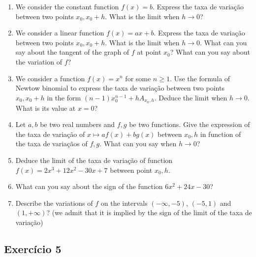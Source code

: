\begin{enumerate}

\item We consider the constant function $f(x) = b$. Express the
  taxa de variação between two points $x_0,x_0+h$.
  What is the limit when $h \rightarrow 0$?

\item We consider a linear function $f(x) = ax + b$. Express the
  taxa de variação between two points $x_0,x_0+h$. What is the limit when
  $h \rightarrow 0$. What can you say about the tangent of the graph of $f$
  at point $x_0$? What can you say about the variation of $f$?

\item We consider a function $f(x) = x^n$ for some $n \geq 1$.
  Use the formula of Newtow binomial to express the taxa de variação between
  two points $x_0,x_0+h$ in the form $(n-1) x_0^{n-1} + h A_{x_0,h}$.
  Deduce the limit when $h \rightarrow 0$. What is its value at $x = 0$?

\item Let $a,b$ be two real numbers and $f,g$ be two functions.
  Give the expression of the taxa de variação of $x \mapsto {af(x)+bg(x)}$
  between $x_0,h$ in function of the taxa de variaçãos of $f,g$.
  What can you say when $h \rightarrow 0$?

\item Deduce the limit of the taxa de variação of
  function $f(x) = 2x^3 + 12x^2 - 30x + 7$ between point $x_0,h$.

\item What can you say about the sign of the function
  $6x^2 + 24x - 30$?

\item Describe the variations of $f$ on the intervals
  $(-\infty,-5)$, $(-5,1)$ and $(1,+\infty)$?
  (we admit that it is implied by the sign of the limit of the taxa de variação)
\end{enumerate}

\subsection*{Exercício 5}

